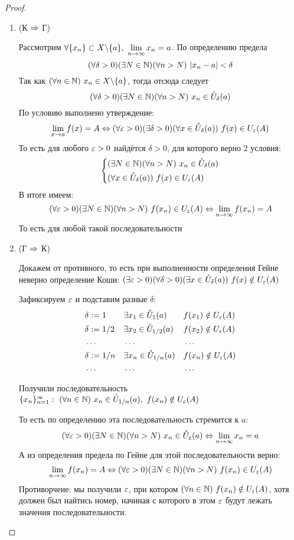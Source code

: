 \begin{proof}
	\begin{enumerate}
		\item (К $\Rightarrow$ Г)
		
		Рассмотрим $\forall \{x_n\} \subset X \backslash \{a\},
		\ \lim\limits_{n \to \infty} x_n = a$. По определению предела
		\[
			(\forall \delta > 0)(\exists N \in \mathbb{N})
			(\forall n > N)\ |x_n - a| < \delta
		\]
		Так как $(\forall n \in \mathbb{N})\ x_n \in X \backslash \{a\}$,
		тогда отсюда следует
		\[
			(\forall \delta > 0)(\exists N \in \mathbb{N})
			(\forall n > N)\ x_n \in \mathring{U}_{\delta}(a)
		\]
		По условию выполнено утверждение:
		\[
			\lim\limits_{x \to a} f(x) = A \Leftrightarrow (\forall \varepsilon > 0)
			(\exists \delta > 0)(\forall x \in \mathring{U}_{\delta}(a))
			\ f(x) \in U_{\varepsilon}(A)
		\]
		То есть для любого $\varepsilon > 0$ найдётся $\delta > 0$, для которого верно 2 условия:
		\[
		\left\{\begin{aligned}
			&{(\exists N \in \mathbb{N})(\forall n > N)\ x_n \in
			\mathring{U}_{\delta}(a)}
			\\
			&{(\forall x \in \mathring{U}_{\delta}(a))\ f(x) \in U_{\varepsilon}(A)}
		\end{aligned}\right.
		\]
		В итоге имеем:
		\[
			(\forall \varepsilon > 0)(\exists N \in \mathbb{N})
			(\forall n > N)\ f(x_n) \in U_{\varepsilon}(A) \Leftrightarrow \lim\limits_{n \to \infty} f(x_n) = A
		\]
		То есть для любой такой последовательности
		
		\item (Г $\Rightarrow$ К)
		
		Докажем от противного, то есть при выполненности
		определения Гейне неверно определение Коши:
		$(\exists \varepsilon > 0)(\forall \delta > 0)
		(\exists x \in \mathring{U}_{\delta}(a))\ f(x) \notin U_{\varepsilon}(A)$
		
		Зафиксируем $\varepsilon$ и подставим разные $\delta$:
		\begin{align*}
			&\delta := 1 & &{\exists x_1 \in \mathring{U}_{1}(a)} & &{f(x_1) \notin U_{\varepsilon}(A)}
			\\
			&\delta := 1/2 & &{\exists x_2 \in \mathring{U}_{1/2}(a)} & &{f(x_2) \notin U_{\varepsilon}(A)}
			\\
			&\dots & &\dots & &\dots
			\\
			&\delta := 1/n & &{\exists x_n \in \mathring{U}_{1/n}(a)} & &{f(x_n) \notin U_{\varepsilon}(A)}
			\\
			&\dots & &\dots & &\dots
		\end{align*}
		
		Получили последовательность
		$\{x_n\}_{n = 1}^\infty :\  (\forall n \in \mathbb{N})
		\ x_n \in \mathring{U}_{1/n}(a),\ f(x_n) \notin U_{\varepsilon}(A)$
		
		То есть по определению эта последовательность стремится к $a$:
		\[
			(\forall \varepsilon > 0)(\exists N \in \mathbb{N})
			(\forall n > N)\ x_n \in \mathring{U}_{\varepsilon}(a) \Leftrightarrow \lim\limits_{n \to \infty} x_n = a
		\]
		А из определения предела по Гейне для этой последовательности верно:
		\[
			\lim\limits_{n \to \infty} f(x_n) =
			A \Leftrightarrow (\forall \varepsilon > 0)(\exists N \in \mathbb{N})
			(\forall n > N)\ f(x_n) \in U_{\varepsilon} (A)
		\]
		Противорчеие: мы получили $\varepsilon$,
		при котором $(\forall n \in \mathbb{N})\ f(x_n) \notin U_\varepsilon(A)$,
		хотя должен был найтись номер, начиная с которого в этом
		$\varepsilon$ будут лежать значения последовательности.
	\end{enumerate}
\end{proof}

